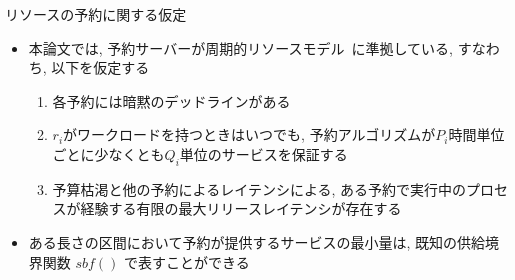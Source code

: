 \begin{frame}{リソースの予約に関する仮定}
    \begin{itemize}
        \item 本論文では, 予約サーバーが周期的リソースモデル~\cite{shin2003periodic}に準拠している, すなわち, 以下を仮定する
        \begin{enumerate}
            \item 各予約には暗黙のデッドラインがある
            \item $r_i$がワークロードを持つときはいつでも, 予約アルゴリズムが$P_i$時間単位ごとに少なくとも$Q_i$単位のサービスを保証する
            \item 予算枯渇と他の予約によるレイテンシによる, ある予約で実行中のプロセスが経験する有限の最大リリースレイテンシが存在する
        \end{enumerate}
        \item ある長さの区間において予約が提供するサービスの最小量は, 既知の供給境界関数 $sbf()$ \cite{shin2003periodic, lipari2003resource} で表すことができる
    \end{itemize}
\end{frame}





